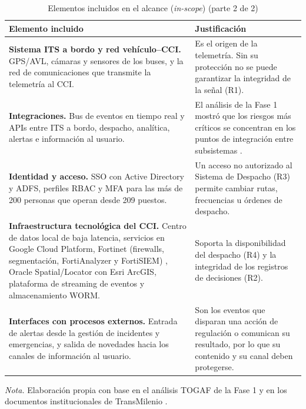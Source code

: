 \begin{table}[H]
	\caption{Elementos incluidos en el alcance (\textit{in-scope}) (parte 2 de 2)}
	\label{tab:alcance-incluido-2}
	\centering
	\footnotesize
	\renewcommand{\arraystretch}{1.15}
	\begin{tabularx}{\textwidth}{@{}>{\raggedright\arraybackslash}p{} Y@{}}
		\toprule
		\textbf{Elemento incluido} & \textbf{Justificación}                                                                                                                              \\
		\midrule
		\textbf{Sistema ITS a bordo y red vehículo--CCI.} GPS/AVL, cámaras y sensores de los buses, y la red de comunicaciones que transmite la telemetría al CCI.
		                           & Es el origen de la telemetría. Sin su protección no se puede garantizar la integridad de la señal (R1).
		\\
		\midrule
		\textbf{Integraciones.} Bus de eventos en tiempo real y APIs entre ITS a bordo, despacho, analítica, alertas e información al usuario.
		                           & El análisis de la Fase 1 mostró que los riesgos más críticos se concentran en los puntos de integración entre subsistemas \parencite{fase1cci2026}.
		\\
		\midrule
		\textbf{Identidad y acceso.} SSO con Active Directory y ADFS, perfiles RBAC y MFA para las más de 200 personas que operan desde 209 puestos.
		                           & Un acceso no autorizado al Sistema de Despacho (R3) permite cambiar rutas, frecuencias u órdenes de despacho.
		\\
		\midrule
		\textbf{Infraestructura tecnológica del CCI.} Centro de datos local de baja latencia, servicios en Google Cloud Platform, Fortinet (firewalls, segmentación, FortiAnalyzer y FortiSIEM) \parencite{transmilenio2025res439,fase1cci2026}, Oracle Spatial/Locator con Esri ArcGIS, plataforma de streaming de eventos y almacenamiento WORM.
		                           & Soporta la disponibilidad del despacho (R4) y la integridad de los registros de decisiones (R2).
		\\
		\midrule
		\textbf{Interfaces con procesos externos.} Entrada de alertas desde la gestión de incidentes y emergencias, y salida de novedades hacia los canales de información al usuario.
		                           & Son los eventos que disparan una acción de regulación o comunican su resultado, por lo que su contenido y su canal deben protegerse.
		\\
		\bottomrule
	\end{tabularx}

	\vspace{0.4em}
	\parbox{\textwidth}{\footnotesize \textit{Nota.} Elaboración propia con base en el análisis TOGAF de la Fase 1 \parencite{fase1cci2026} y en los documentos institucionales de TransMilenio \parencite{transmilenio2020peti,transmilenio2026cci}.}
\end{table}

